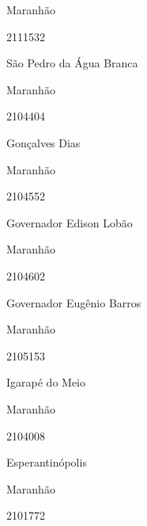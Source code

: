 \documentclass[
  letterpaper,
]{report}
\begin{document}
Maranhão

\n      

2111532

\n      

São Pedro da Água Branca

\n    

\n    

\n      

Maranhão

\n      

2104404

\n      

Gonçalves Dias

\n    

\n    

\n      

Maranhão

\n      

2104552

\n      

Governador Edison Lobão

\n    

\n    

\n      

Maranhão

\n      

2104602

\n      

Governador Eugênio Barros

\n    

\n    

\n      

Maranhão

\n      

2105153

\n      

Igarapé do Meio

\n    

\n    

\n      

Maranhão

\n      

2104008

\n      

Esperantinópolis

\n    

\n    

\n      

Maranhão

\n      

2101772

\n      
\end{document}
